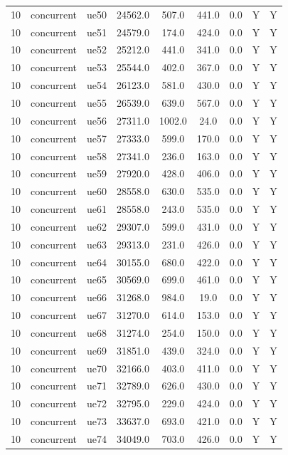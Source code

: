 \begin{table}[ht]
\begin{tabular}{|c|c|c|c|c|c|c|c|c|}
10 & concurrent & ue50 & 24562.0 & 507.0 & 441.0 & 0.0 & Y & Y \\
10 & concurrent & ue51 & 24579.0 & 174.0 & 424.0 & 0.0 & Y & Y \\
10 & concurrent & ue52 & 25212.0 & 441.0 & 341.0 & 0.0 & Y & Y \\
10 & concurrent & ue53 & 25544.0 & 402.0 & 367.0 & 0.0 & Y & Y \\
10 & concurrent & ue54 & 26123.0 & 581.0 & 430.0 & 0.0 & Y & Y \\
10 & concurrent & ue55 & 26539.0 & 639.0 & 567.0 & 0.0 & Y & Y \\
10 & concurrent & ue56 & 27311.0 & 1002.0 & 24.0 & 0.0 & Y & Y \\
10 & concurrent & ue57 & 27333.0 & 599.0 & 170.0 & 0.0 & Y & Y \\
10 & concurrent & ue58 & 27341.0 & 236.0 & 163.0 & 0.0 & Y & Y \\
10 & concurrent & ue59 & 27920.0 & 428.0 & 406.0 & 0.0 & Y & Y \\
10 & concurrent & ue60 & 28558.0 & 630.0 & 535.0 & 0.0 & Y & Y \\
10 & concurrent & ue61 & 28558.0 & 243.0 & 535.0 & 0.0 & Y & Y \\
10 & concurrent & ue62 & 29307.0 & 599.0 & 431.0 & 0.0 & Y & Y \\
10 & concurrent & ue63 & 29313.0 & 231.0 & 426.0 & 0.0 & Y & Y \\
10 & concurrent & ue64 & 30155.0 & 680.0 & 422.0 & 0.0 & Y & Y \\
10 & concurrent & ue65 & 30569.0 & 699.0 & 461.0 & 0.0 & Y & Y \\
10 & concurrent & ue66 & 31268.0 & 984.0 & 19.0 & 0.0 & Y & Y \\
10 & concurrent & ue67 & 31270.0 & 614.0 & 153.0 & 0.0 & Y & Y \\
10 & concurrent & ue68 & 31274.0 & 254.0 & 150.0 & 0.0 & Y & Y \\
10 & concurrent & ue69 & 31851.0 & 439.0 & 324.0 & 0.0 & Y & Y \\
10 & concurrent & ue70 & 32166.0 & 403.0 & 411.0 & 0.0 & Y & Y \\
10 & concurrent & ue71 & 32789.0 & 626.0 & 430.0 & 0.0 & Y & Y \\
10 & concurrent & ue72 & 32795.0 & 229.0 & 424.0 & 0.0 & Y & Y \\
10 & concurrent & ue73 & 33637.0 & 693.0 & 421.0 & 0.0 & Y & Y \\
10 & concurrent & ue74 & 34049.0 & 703.0 & 426.0 & 0.0 & Y & Y \\

\end{tabular}
\end{table}
